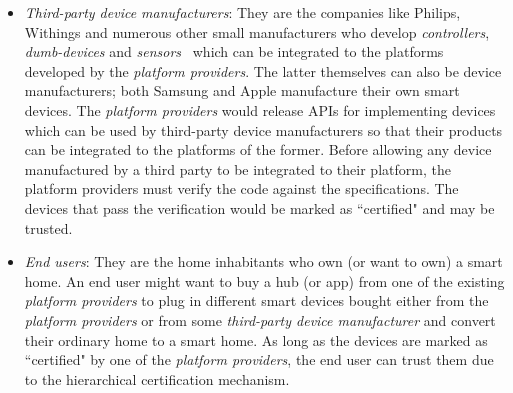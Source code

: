 \documentclass{article}
\begin{document}
\begin{itemize}[topsep=0pt,itemsep=0ex,partopsep=1ex,parsep=1ex]
\item \textit{Third-party device manufacturers}: They are the companies like Philips, Withings and numerous other small manufacturers who develop \textit{controllers}, \textit{dumb-devices} and \textit{sensors}~\cite{workswithsmartthings, workswithhomekit} which can be integrated to the platforms developed by the \textit{platform providers}. The latter themselves can also be device manufacturers; both Samsung and Apple manufacture their own smart devices. 
The \textit{platform providers} would release APIs for implementing devices which can be used by third-party device manufacturers so that their products can be integrated to the platforms of the former.
Before  allowing any device manufactured by a third party to be integrated to their platform, the platform providers must verify the code against the specifications. The devices that pass the verification would be marked as ``certified" and may be trusted. 

\item \textit{End users}: They are the home inhabitants who own (or want to own) a smart home. An end user might want to buy a hub (or app) from one of the existing \textit{platform providers} to plug in different smart devices bought either from the \textit{platform providers} or from some \textit{third-party device manufacturer} and convert their ordinary home to a smart home. As long as the devices are marked as ``certified" by one of the \textit{platform providers}, the end user can trust them due to the hierarchical certification mechanism.
\end{itemize}



\end{document}
